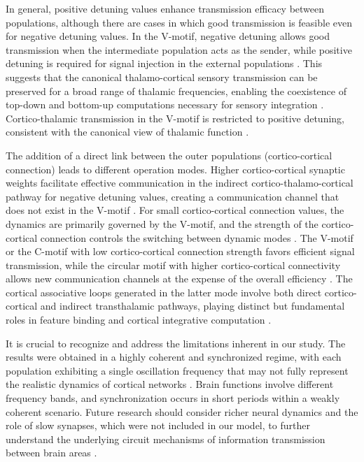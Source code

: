 \documentclass[../main.tex]{subfiles}
\begin{document}
In general, positive detuning values enhance transmission efficacy between populations, although there are cases in which good transmission is feasible even for negative detuning values.
In the V-motif, negative detuning allows good transmission when the intermediate population acts as the sender, while positive detuning is required for signal injection in the external populations \citep{pariz_transmission_2021}.
This suggests that the canonical thalamo-cortical sensory transmission can be preserved for a broad range of thalamic frequencies, enabling the coexistence of top-down and bottom-up computations necessary for sensory integration \citep{hirsch_how_2015}.
Cortico-thalamic transmission in the V-motif is restricted to positive detuning, consistent with the canonical view of thalamic function \citep{sherman_thalamus_2016}.

The addition of a direct link between the outer populations (cortico-cortical connection) leads to different operation modes.
Higher cortico-cortical synaptic weights facilitate effective communication in the indirect cortico-thalamo-cortical pathway for negative detuning values, creating a communication channel that does not exist in the V-motif \citep{pariz_transmission_2021}.
For small cortico-cortical connection values, the dynamics are primarily governed by the V-motif, and the strength of the cortico-cortical connection controls the switching between dynamic modes \citep{pariz_transmission_2021}.
The V-motif or the C-motif with low cortico-cortical connection strength favors efficient signal transmission, while the circular motif with higher cortico-cortical connectivity allows new communication channels at the expense of the overall efficiency \citep{pariz_transmission_2021}.
The cortical associative loops generated in the latter mode involve both direct cortico-cortical and indirect transthalamic pathways, playing distinct but fundamental roles in feature binding and cortical integrative computation \citep{singer_binding_2007, uhlhaas_neural_2009, gollo_dynamic_2010}.

It is crucial to recognize and address the limitations inherent in our study.
The results were obtained in a highly coherent and synchronized regime, with each population exhibiting a single oscillation frequency that may not fully represent the realistic dynamics of cortical networks \citep{xing_stochastic_2012}.
Brain functions involve different frequency bands, and synchronization occurs in short periods within a weakly coherent scenario.
Future research should consider richer neural dynamics and the role of slow synapses, which were not included in our model, to further understand the underlying circuit mechanisms of information transmission between brain areas \citep{tort_theta-associated_2013, palmigiano_flexible_2017-1, cannon_neurosystems_2014}.
\end{document}

